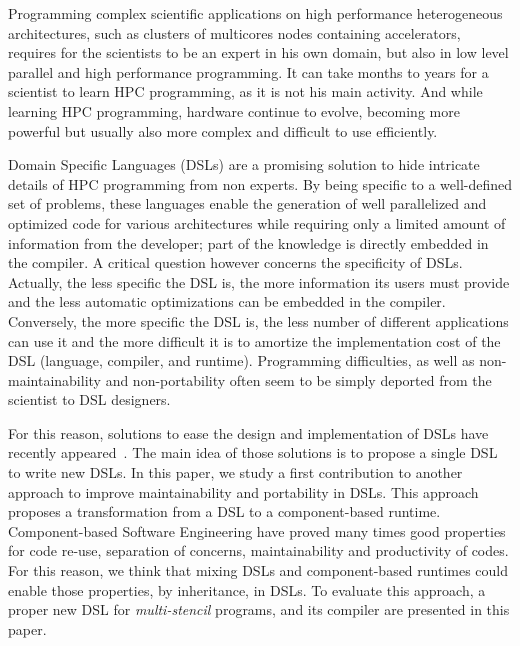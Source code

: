 Programming complex scientific applications on high performance heterogeneous architectures, such as clusters of multicores nodes containing accelerators, requires for the scientists to be an expert in his own domain, but also in low level parallel and high performance programming. It can take months to years for a scientist to learn HPC programming, as it is not his main activity. And while learning HPC programming, hardware continue to evolve, becoming more powerful but usually also more complex and difficult to use efficiently.

Domain Specific Languages (DSLs) are a promising solution to hide intricate details of HPC programming from non experts.
By being specific to a well-defined set of problems, these languages enable the generation of well parallelized and optimized code for various architectures while requiring only a limited amount of information from the developer; part of the knowledge is directly embedded in the compiler.
A critical question however concerns the specificity of DSLs.
Actually, the less specific the DSL is, the more information its users must provide and the less automatic optimizations can be embedded in the compiler.
Conversely, the more specific the DSL is, the less number of different applications can use it and the more difficult it is to amortize the implementation cost of the DSL (language, compiler, and runtime).
Programming difficulties, as well as non-maintainability and non-portability often seem to be simply deported from the scientist to DSL designers.

For this reason, solutions to ease the design and implementation of DSLs have recently appeared~\cite{Fernandez:2014:DFL:2691166.2691168}. The main idea of those solutions is to propose a single DSL to write new DSLs. In this paper, we study a first contribution to another approach to improve maintainability and portability in DSLs. This approach proposes a transformation from a DSL to a component-based runtime. Component-based Software Engineering have proved many times good properties for code re-use, separation of concerns, maintainability and productivity of codes. For this reason, we think that mixing DSLs and component-based runtimes could enable those properties, by inheritance, in DSLs.
To evaluate this approach, a proper new DSL for \emph{multi-stencil} programs, and its compiler are presented in this paper.

